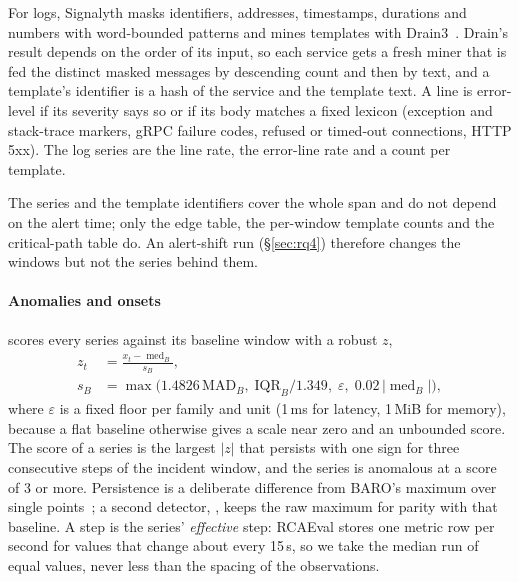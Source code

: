 For logs, Signalyth masks identifiers, addresses, timestamps, durations and numbers with word-bounded patterns and mines templates with Drain3~\cite{drain3}.
Drain's result depends on the order of its input, so each service gets a fresh miner that is fed the distinct masked messages by descending count and then by text, and a template's identifier is a hash of the service and the template text.
A line is error-level if its severity says so or if its body matches a fixed lexicon (exception and stack-trace markers, gRPC failure codes, refused or timed-out connections, HTTP 5xx).
The log series are the line rate, the error-line rate and a count per template.

The series and the template identifiers cover the whole span and do not depend on the alert time; only the edge table, the per-window template counts and the critical-path table do.
An alert-shift run (\S\ref{sec:rq4}) therefore changes the windows but not the series behind them.

\paragraph{Anomalies and onsets}
 scores every series against its baseline window with a robust $z$,
\begin{equation}
\begin{aligned}
z_t &= \frac{x_t - \operatorname{med}_B}{s_B}, \\
s_B &= \max\bigl(1.4826\,\text{MAD}_B,\; \text{IQR}_B / 1.349,\; \varepsilon,\; 0.02\,\lvert\operatorname{med}_B\rvert\bigr),
\end{aligned}
\end{equation}
where $\varepsilon$ is a fixed floor per family and unit (1\,ms for latency, 1\,MiB for memory), because a flat baseline otherwise gives a scale near zero and an unbounded score.
The score of a series is the largest $\lvert z \rvert$ that persists with one sign for three consecutive steps of the incident window, and the series is anomalous at a score of 3 or more.
Persistence is a deliberate difference from BARO's maximum over single points~\cite{baro2024}; a second detector, , keeps the raw maximum for parity with that baseline.
A step is the series' \emph{effective} step: RCAEval stores one metric row per second for values that change about every 15\,s, so we take the median run of equal values, never less than the spacing of the observations.

